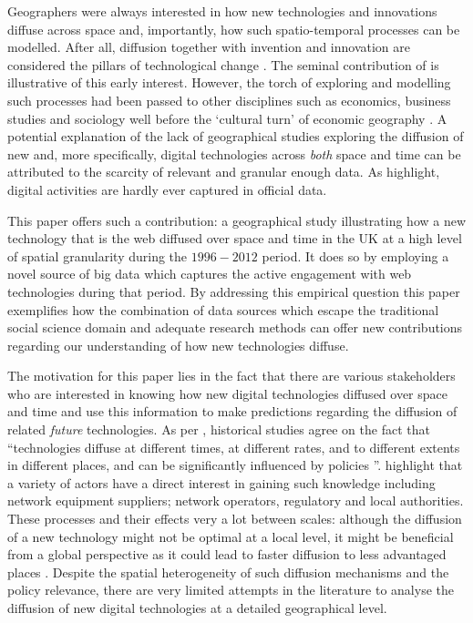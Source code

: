 \documentclass[
  authoryear,
  preprint,
  3p]{elsarticle}
\begin{document}
Geographers were always interested in how new technologies and
innovations diffuse across space and, importantly, how such
spatio-temporal processes can be modelled. After all, diffusion together
with invention and innovation are considered the pillars of
technological change \citep{das2022diffusion}. The seminal contribution
of \citet{hagerstrand1968innovation} is illustrative of this early
interest. However, the torch of exploring and modelling such processes
had been passed to other disciplines such as economics, business studies
and sociology well before the `cultural turn' of economic geography
\citep{perkins2005international}. A potential explanation of the lack of
geographical studies exploring the diffusion of new and, more
specifically, digital technologies across \emph{both} space and time can
be attributed to the scarcity of relevant and granular enough data. As
\citet{zook2022mapping} highlight, digital activities are hardly ever
captured in official data.

This paper offers such a contribution: a geographical study illustrating
how a new technology that is the web diffused over space and time in the
UK at a high level of spatial granularity during the \(1996-2012\)
period. It does so by employing a novel source of big data which
captures the active engagement with web technologies during that period.
By addressing this empirical question this paper exemplifies how the
combination of data sources which escape the traditional social science
domain and adequate research methods can offer new contributions
regarding our understanding of how new technologies diffuse.

The motivation for this paper lies in the fact that there are various
stakeholders who are interested in knowing how new digital technologies
diffused over space and time and use this information to make
predictions regarding the diffusion of related \emph{future}
technologies. As per \citet{leibowicz2016representing}, historical
studies agree on the fact that ``technologies diffuse at different
times, at different rates, and to different extents in different places,
and can be significantly influenced by policies \citep{victor1993}''.
\citet{meade2021modelling} highlight that a variety of actors have a
direct interest in gaining such knowledge including network equipment
suppliers; network operators, regulatory and local authorities. These
processes and their effects very a lot between scales: although the
diffusion of a new technology might not be optimal at a local level, it
might be beneficial from a global perspective as it could lead to faster
diffusion to less advantaged places \citep{leibowicz2016representing}.
Despite the spatial heterogeneity of such diffusion mechanisms and the
policy relevance, there are very limited attempts in the literature to
analyse the diffusion of new digital technologies at a detailed
geographical level.
\end{document}
